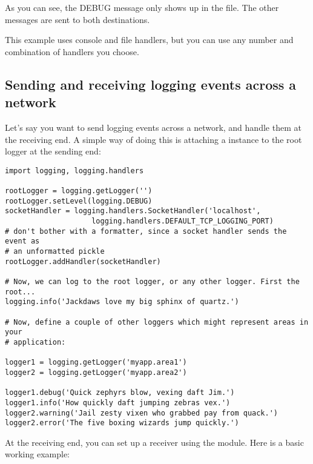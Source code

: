 As you can see, the DEBUG message only shows up in the file. The other
messages are sent to both destinations.

This example uses console and file handlers, but you can use any number and
combination of handlers you choose.

\subsection{Sending and receiving logging events across a network
\label{network-logging}}

Let's say you want to send logging events across a network, and handle them
at the receiving end. A simple way of doing this is attaching a
 instance to the root logger at the sending end:

\begin{verbatim}
import logging, logging.handlers

rootLogger = logging.getLogger('')
rootLogger.setLevel(logging.DEBUG)
socketHandler = logging.handlers.SocketHandler('localhost',
                    logging.handlers.DEFAULT_TCP_LOGGING_PORT)
# don't bother with a formatter, since a socket handler sends the event as
# an unformatted pickle
rootLogger.addHandler(socketHandler)

# Now, we can log to the root logger, or any other logger. First the root...
logging.info('Jackdaws love my big sphinx of quartz.')

# Now, define a couple of other loggers which might represent areas in your
# application:

logger1 = logging.getLogger('myapp.area1')
logger2 = logging.getLogger('myapp.area2')

logger1.debug('Quick zephyrs blow, vexing daft Jim.')
logger1.info('How quickly daft jumping zebras vex.')
logger2.warning('Jail zesty vixen who grabbed pay from quack.')
logger2.error('The five boxing wizards jump quickly.')
\end{verbatim}

At the receiving end, you can set up a receiver using the
 module. Here is a basic working example:

